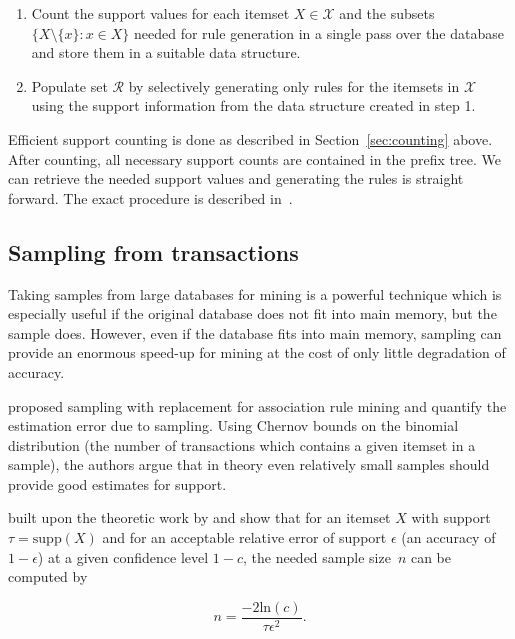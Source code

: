 \documentclass[10pt,a4paper]{article}
\newcommand{\set}[1]{\mathcal{#1}}
\begin{document}
\begin{enumerate}
    \item Count  the support values for each itemset $X \in \set{X}$ and the
        subsets $\{X \setminus \{x\}: x \in X\}$ needed for rule generation
        in a single pass over the database
        and store them in a suitable data structure.
    \item Populate set $\set{R}$ by selectively generating only rules for the
        itemsets in $\set{X}$ using the support information
        from the data structure created in step 1.
\end{enumerate}


Efficient support counting is done as described in Section~\ref{sec:counting}
above. After counting, all necessary support counts are contained in the prefix
tree. We can retrieve the needed support values and generating the rules is
straight forward. The exact procedure is described
in~\cite{arules:Hahsler+Buchta+Hornik:2007}.


\subsection{Sampling from transactions\label{sec:sample}}

Taking samples from large databases for mining is a powerful technique
which is especially useful if the original database does not fit into
main memory, but the sample does.  However, even if the database fits
into main memory, sampling can provide an enormous speed-up for mining
at the cost of only little degradation of accuracy.

\cite{arules:Mannila+Toivonen+Verkamo:1994}
proposed sampling with replacement for association rule mining
and quantify the estimation error due to sampling.
Using Chernov bounds on the binomial distribution (the number of
transactions which contains a given itemset in a sample),
the authors argue that in theory even relatively small samples 
should provide good estimates for support.

\cite{arules:Zaki+Parthasarathy+Li+Ogihara:1997} built upon the
theoretic work by \cite{arules:Mannila+Toivonen+Verkamo:1994} and show
that for an itemset $X$ with support $\tau = \mathrm{supp}(X)$ and for
an acceptable relative error of support $\epsilon$ (an accuracy of $1 -
\epsilon$) at a given confidence level $1-c$, the needed sample size~$n$
can be computed by

\begin{equation}
n = \frac{-2\mathrm{ln}(c)}{\tau\epsilon^2}.
\label{equ:samplesize}
\end{equation}
\end{document}
